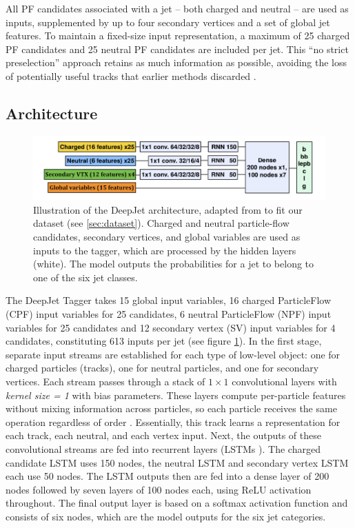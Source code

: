 All PF candidates associated with a jet – both charged and neutral – are used as inputs, supplemented by up to four secondary vertices and a set of global jet features. To maintain a fixed-size input representation, a maximum of 25 charged PF candidates and 25 neutral PF candidates are included per jet. This “no strict preselection” approach retains as much information as possible, avoiding the loss of potentially useful tracks that earlier methods discarded \cite{Bols_2020}.

\subsection{Architecture}

\begin{figure}[h]
    \centering
    \includegraphics[width=1\linewidth]{media/deepJet_architecture.png}
    \caption{Illustration of the DeepJet architecture, adapted from \cite{Bols_2020} to fit our dataset (see \ref{sec:dataset}). Charged and neutral particle-flow
candidates, secondary vertices, and global variables are used as inputs to the tagger, which are processed by the hidden layers (white). The model outputs the probabilities for a jet to belong to one of the six jet classes.}
    \label{fig:deepjetArchitecture}
\end{figure}

The DeepJet Tagger takes 15 global input variables, 16 charged ParticleFlow (CPF) input variables for 25 candidates, 6 neutral ParticleFlow (NPF) input variables for 25 candidates and 12 secondary vertex (SV) input variables for 4 candidates, constituting 613 inputs per jet (see figure \ref{fig:deepjetArchitecture}). In the first stage, separate input streams are established for each type of low-level object: one for charged particles (tracks), one for neutral particles, and one for secondary vertices. Each stream passes through a stack of $1\times1$ convolutional layers with \textit{kernel size = 1} with bias parameters. These layers compute per-particle features without mixing information across particles, so each particle receives the same operation regardless of order \cite{Bols_2020}. Essentially, this track learns a representation for each track, each neutral, and each vertex input. Next, the outputs of these convolutional streams are fed into recurrent layers (LSTMs \cite{Goodfellow-et-al-2016}). The charged candidate LSTM uses 150 nodes, the neutral LSTM and secondary vertex LSTM each use 50 nodes. The LSTM outputs then are fed into a dense layer of 200 nodes followed by seven layers of 100 nodes each, using ReLU activation throughout. The final output layer is based on a softmax activation function and consists of six nodes, which are the model outputs for the six jet categories.
